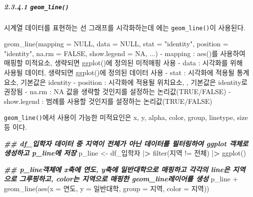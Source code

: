 \documentclass[
]{article}
\newenvironment{Shaded}{\begin{snugshade}}{\end{snugshade}}
\newcommand{\AttributeTok}[1]{\textcolor[rgb]{0.77,0.63,0.00}{#1}}
\newcommand{\ConstantTok}[1]{\textcolor[rgb]{0.00,0.00,0.00}{#1}}
\newcommand{\DocumentationTok}[1]{\textcolor[rgb]{0.56,0.35,0.01}{\textbf{\textit{#1}}}}
\newcommand{\ErrorTok}[1]{\textcolor[rgb]{0.64,0.00,0.00}{\textbf{#1}}}
\newcommand{\FunctionTok}[1]{\textcolor[rgb]{0.00,0.00,0.00}{#1}}
\newcommand{\NormalTok}[1]{#1}
\newcommand{\OtherTok}[1]{\textcolor[rgb]{0.56,0.35,0.01}{#1}}
\newcommand{\SpecialCharTok}[1]{\textcolor[rgb]{0.00,0.00,0.00}{#1}}
\newcommand{\StringTok}[1]{\textcolor[rgb]{0.31,0.60,0.02}{#1}}
\begin{document}
\hypertarget{geom_line}{%
\subparagraph{\texorpdfstring{2.3.4.1 \texttt{geom\_line()}}{2.3.4.1 geom\_line()}}\label{geom_line}}

시계열 데이터를 표현하는 선 그래프를 시각화하는데 에는 \texttt{geom\_line()}이 사용된다.

\begin{Shaded}
\begin{Highlighting}[]
\FunctionTok{geom\_line}\NormalTok{(}\AttributeTok{mapping =} \ConstantTok{NULL}\NormalTok{, }\AttributeTok{data =} \ConstantTok{NULL}\NormalTok{, }\AttributeTok{stat =} \StringTok{"identity"}\NormalTok{, }\AttributeTok{position =} \StringTok{"identity"}\NormalTok{, }\AttributeTok{na.rm =} \ConstantTok{FALSE}\NormalTok{, }\AttributeTok{show.legend =} \ConstantTok{NA}\NormalTok{, ...)}
  \SpecialCharTok{{-}}\NormalTok{ mapping }\SpecialCharTok{:} \FunctionTok{aes}\NormalTok{()를 사용하여 매핑할 미적요소, 생략되면 }\FunctionTok{ggplot}\NormalTok{()에 정의된 미적매핑 사용}
  \SpecialCharTok{{-}}\NormalTok{ data }\SpecialCharTok{:}\NormalTok{ 시각화를 위해 사용될 데이터, 생략되면 }\FunctionTok{ggplot}\NormalTok{()에 정의된 데이터 사용}
  \SpecialCharTok{{-}}\NormalTok{ stat }\SpecialCharTok{:}\NormalTok{ 시각화에 적용될 통계요소, 기본값은 }\StringTok{\textquotesingle{}identity\textquotesingle{}}
  \SpecialCharTok{{-}}\NormalTok{ position }\SpecialCharTok{:}\NormalTok{ 시각화에 적용될 위치요소, , 기본값은 }\StringTok{\textquotesingle{}identity\textquotesingle{}}\NormalTok{로 권장됨}
  \SpecialCharTok{{-}}\NormalTok{ na.rm }\SpecialCharTok{:} \ConstantTok{NA}\NormalTok{ 값을 생략할 것인지를 설정하는 논리값(}\ConstantTok{TRUE}\SpecialCharTok{/}\ConstantTok{FALSE}\NormalTok{)}
  \SpecialCharTok{{-}}\NormalTok{ show.legend }\SpecialCharTok{:}\NormalTok{ 범례를 사용할 것인지를 설정하는 논리값(}\ConstantTok{TRUE}\SpecialCharTok{/}\ConstantTok{FALSE}\NormalTok{) }
\end{Highlighting}
\end{Shaded}

\texttt{geom\_line()}에서 사용이 가능한 미적요인은 x, y, alpha, color, group, linetype, size 등 이다.

\begin{Shaded}
\begin{Highlighting}[]
\DocumentationTok{\#\#  df\_입학자 데이터 중 지역이 전체가 아닌 데이터를 필터링하여 ggplot 객체로 생성하고 p\_line에 저장}
\NormalTok{p\_line }\OtherTok{\textless{}{-}}\NormalTok{ df\_입학자 }\SpecialCharTok{|}\ErrorTok{\textgreater{}} \FunctionTok{filter}\NormalTok{(지역 }\SpecialCharTok{!=} \StringTok{\textquotesingle{}전체\textquotesingle{}}\NormalTok{) }\SpecialCharTok{|}\ErrorTok{\textgreater{}}
  \FunctionTok{ggplot}\NormalTok{()}

\DocumentationTok{\#\#  p\_line객체에 x축에 연도, y축에 일반대학으로 매핑하고 각각의 line은 지역으로 그루핑하고, color는 지역으로 매핑한 geom\_line레이어를 생성}
\NormalTok{p\_line }\SpecialCharTok{+} 
  \FunctionTok{geom\_line}\NormalTok{(}\FunctionTok{aes}\NormalTok{(}\AttributeTok{x =}\NormalTok{ 연도, }\AttributeTok{y =}\NormalTok{ 일반대학, }\AttributeTok{group =}\NormalTok{ 지역, }\AttributeTok{color =}\NormalTok{ 지역))}
\end{Highlighting}
\end{Shaded}
\end{document}
